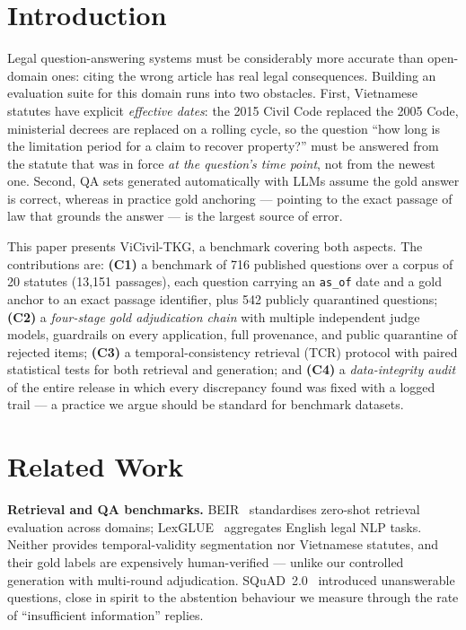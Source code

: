 \documentclass[10pt,a4paper,twocolumn]{article}
\newcommand{\code}[1]{\texttt{#1}}
\begin{document}
\section{Introduction}

Legal question-answering systems must be considerably more accurate than open-domain ones: citing the wrong article has real legal consequences. Building an evaluation suite for this domain runs into two obstacles. First, Vietnamese statutes have explicit \emph{effective dates}: the 2015 Civil Code replaced the 2005 Code, ministerial decrees are replaced on a rolling cycle, so the question ``how long is the limitation period for a claim to recover property?'' must be answered from the statute that was in force \emph{at the question's time point}, not from the newest one. Second, QA sets generated automatically with LLMs assume the gold answer is correct, whereas in practice gold anchoring --- pointing to the exact passage of law that grounds the answer --- is the largest source of error.

This paper presents ViCivil-TKG, a benchmark covering both aspects. The contributions are: \textbf{(C1)} a benchmark of 716 published questions over a corpus of 20 statutes (13{,}151 passages), each question carrying an \code{as\_of} date and a gold anchor to an exact passage identifier, plus 542 publicly quarantined questions; \textbf{(C2)} a \emph{four-stage gold adjudication chain} with multiple independent judge models, guardrails on every application, full provenance, and public quarantine of rejected items; \textbf{(C3)} a temporal-consistency retrieval (TCR) protocol with paired statistical tests for both retrieval and generation; and \textbf{(C4)} a \emph{data-integrity audit} of the entire release in which every discrepancy found was fixed with a logged trail --- a practice we argue should be standard for benchmark datasets.

\section{Related Work}

\textbf{Retrieval and QA benchmarks.} BEIR~\cite{thakur2021beir} standardises zero-shot retrieval evaluation across domains; LexGLUE~\cite{chalkidis2022lexglue} aggregates English legal NLP tasks. Neither provides temporal-validity segmentation nor Vietnamese statutes, and their gold labels are expensively human-verified --- unlike our controlled generation with multi-round adjudication. SQuAD~2.0~\cite{rajpurkar2018squad} introduced unanswerable questions, close in spirit to the abstention behaviour we measure through the rate of ``insufficient information'' replies.
\end{document}
